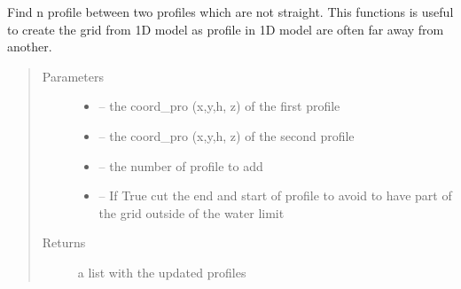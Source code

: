 \documentclass[letterpaper,10pt,english]{sphinxmanual}
\begin{document}
\begin{fulllineitems}
\label{\detokenize{index:src.manage_grid_8.find_profile_between}}
Find n profile between two profiles which are not straight. This functions is useful to create the grid from 1D model
as profile in 1D model are often far away from another.
\begin{quote}\begin{description}
\item[{Parameters}] \leavevmode\begin{itemize}
\item {} 
 -- the coord\_pro (x,y,h, z) of the first profile

\item {} 
 -- the coord\_pro (x,y,h, z) of the second profile

\item {} 
 -- the number of profile to add

\item {} 
 -- If True cut the end and start of profile to avoid to have part of the grid outside of the water limit

\end{itemize}

\item[{Returns}] \leavevmode
a list with the updated profiles

\end{description}\end{quote}

\end{fulllineitems}

\end{document}

